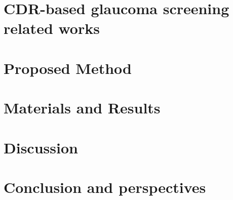 \documentclass[review]{elsarticle}
\begin{document}




\section{\label{related_work}CDR-based glaucoma screening related works}




\section{\label{proposed_method}Proposed Method}




\section{\label{materials_results}Materials and Results}




\section{\label{discussion}Discussion}




\section{\label{conclusion_perspectives}Conclusion and perspectives}






\end{document}
